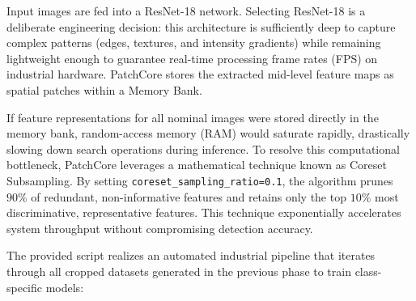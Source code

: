 \documentclass{article}
\begin{document}
Input images are fed into a ResNet-18 network. Selecting ResNet-18 is a deliberate engineering decision: this architecture is sufficiently deep to capture complex patterns (edges, textures, and intensity gradients) while remaining lightweight enough to guarantee real-time processing frame rates (FPS) on industrial hardware. PatchCore stores the extracted mid-level feature maps as spatial patches within a Memory Bank.

If feature representations for all nominal images were stored directly in the memory bank, random-access memory (RAM) would saturate rapidly, drastically slowing down search operations during inference. To resolve this computational bottleneck, PatchCore leverages a mathematical technique known as Coreset Subsampling. By setting \texttt{coreset\_sampling\_ratio=0.1}, the algorithm prunes $90\%$ of redundant, non-informative features and retains only the top $10\%$ most discriminative, representative features. This technique exponentially accelerates system throughput without compromising detection accuracy.

The provided script realizes an automated industrial pipeline that iterates through all cropped datasets generated in the previous phase to train class-specific models:
\end{document}

